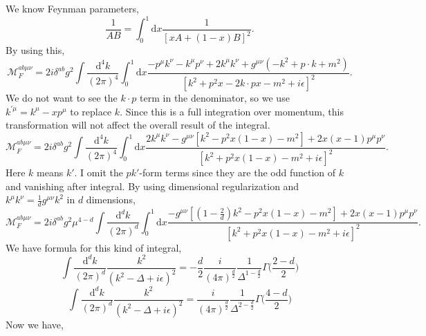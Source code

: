\documentclass[a4paper,12pt]{article}
\renewcommand{\d}{\mathrm{d}}
\begin{document}
We know Feynman parameters,
\begin{equation}
    \frac{1}{AB}=\int_0^1 \d x\frac{1}{[xA+(1-x)B]^2}.
\end{equation}
By using this,
\begin{equation}
    \mathcal{M}_{F}^{ab \mu \nu}
        =2i\delta^{ab}g^2\int\frac{\d^{4}k}{(2\pi)^{4}}\int_0^1 \d x \frac{-p^{\mu}k^{\nu}-k^{\mu}p^{\nu}+2k^{\mu}k^{\nu}+g^{\mu\nu}(-k^{2}+p\cdot k+m^{2})}{[k^2+p^2x-2k\cdot p x-m^2+i \epsilon]^2}.
\end{equation}
We do not want to see the $k\cdot p$ term in the denominator, so we use $k^{'\mu}=k^\mu-xp^\mu$  to replace $k$. 
Since this is a full integration over momentum, this transformation will not affect the overall result of the integral.
\begin{equation}
    \mathcal{M}_{F}^{ab \mu \nu}
        =2i\delta^{ab}g^2\int\frac{\d^{4}k}{(2\pi)^{4}}\int_0^1 \d x \frac{2k^{\mu}k^{\nu}-g^{\mu\nu}[k^{2}-p^2x(1-x)-m^{2}]+2x(x-1)p^\mu p^\nu}{[k^2+p^2x(1-x)-m^2+i \epsilon]^2}.
\end{equation}
Here $k$ means $k'$. I omit the $pk'$-form terms since they are the odd function of $k$ and vanishing after integral. 
By using dimensional regularization and $k^\mu k^\nu=\frac{1}{d}g^{\mu \nu}k^2$ in $d$ dimensions,  
\begin{equation}
    \mathcal{M}_{F}^{ab \mu \nu}
        =2i\delta^{ab}g^2\mu^{4-d}\int\frac{\d^{d}k}{(2\pi)^{d}}\int_0^1 \d x \frac{-g^{\mu\nu}[(1-\frac{2}{d})k^{2}-p^2x(1-x)-m^{2}]+2x(x-1)p^\mu p^\nu}{[k^2+p^2x(1-x)-m^2+i \epsilon]^2}.
\end{equation}
We have formula for this kind of integral,
\begin{equation}
    \int\frac{\d^d k}{(2\pi)^d}\frac{k^2}{(k^2-\Delta+i \epsilon)^2}=-\frac{d}{2}\frac{i}{(4\pi)^{\frac{d}{2}}}\frac{1}{\Delta^{1-\frac{d}{2}}}\Gamma\Big(\frac{2-d}{2}\Big)
\end{equation}
\begin{equation}
    \int\frac{\d^d k}{(2\pi)^d}\frac{k^2}{(k^2-\Delta+i \epsilon)^2}=\frac{i}{(4\pi)^{\frac{d}{2}}}\frac{1}{\Delta^{2-\frac{d}{2}}}\Gamma\Big(\frac{4-d}{2}\Big)
\end{equation}
Now we have,
\end{document}
